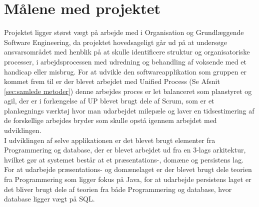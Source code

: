 \section{Målene med projektet}
Projektet ligger størst vægt på arbejde med i Organisation og Grundlæggende Software Engineering, da projektet hovedsageligt går ud på at undersøge ansvarsområdet med henblik på at skulle identificere struktur og organisatoriske processer, i arbejdsprocessen med udredning og behandling af voksende med et handicap eller misbrug. For at udvikle den softwareapplikation som gruppen er kommet frem til er der blevet arbejdet med Unified Process 
(Se Afsnit \ref{sec:samlede metoder}) %
denne arbejdes proces er let balanceret som planstyret og agil, der er i forlængelse af UP blevet brugt dele af Scrum, som er et planlægnings værktøj hvor man udarbejdet milepæle og laver en tidsestimering af de forskellige arbejdes bryder som skulle opstå igennem arbejdet med udviklingen.\\
I udviklingen af selve applikationen er det blevet brugt elementer fra Programmering og database, der er blevet arbejdet ud fra en 3-lags arkitektur, hvilket gør at systemet består at et præsentations-, domæne og persistens lag. For at udarbejde præsentations- og domænelaget er der blevet brugt dele teorien fra Programmering som ligger fokus på Java, for at udarbejde persistens laget er det bliver brugt dele af teorien fra både Programmering og database, hvor database ligger vægt på SQL.


